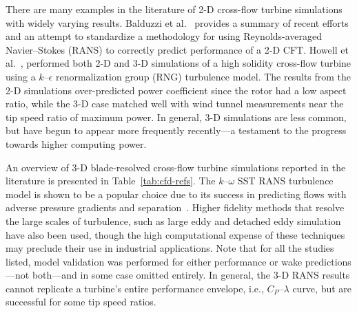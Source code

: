 \documentclass[aip,graphicx]{revtex4-1}
\begin{document}
There are many examples in the literature of 2-D cross-flow turbine simulations
with widely varying results. Balduzzi et al.~\cite{Balduzzi2016} provides a
summary of recent efforts and an attempt to standardize a methodology for using
Reynolds-averaged Navier--Stokes (RANS) to correctly predict performance of a
2-D CFT. Howell et al.~\cite{Howell2010}, performed both 2-D and 3-D simulations
of a high solidity cross-flow turbine using a $k$--$\epsilon$ renormalization
group (RNG) turbulence model. The results from the 2-D simulations
over-predicted power coefficient since the rotor had a low aspect ratio, while
the 3-D case matched well with wind tunnel measurements near the tip speed ratio
of maximum power. In general, 3-D simulations are less common, but have begun to
appear more frequently recently---a testament to the progress towards higher
computing power.

An overview of 3-D blade-resolved cross-flow turbine simulations reported in the
literature is presented in Table~\ref{tab:cfd-refs}. The $k$--$\omega$ SST RANS
turbulence model is shown to be a popular choice due to its success in
predicting flows with adverse pressure gradients and
separation~\cite{Menter2003}. Higher fidelity methods that resolve the large
scales of turbulence, such as large eddy and detached eddy simulation have also
been used, though the high computational expense of these techniques may
preclude their use in industrial applications. Note that for all the studies
listed, model validation was performed for either performance or wake
predictions---not both---and in some case omitted entirely. In general, the 3-D
RANS results cannot replicate a turbine's entire performance envelope, i.e.,
$C_P$--$\lambda$ curve, but are successful for some tip speed ratios.
\end{document}
